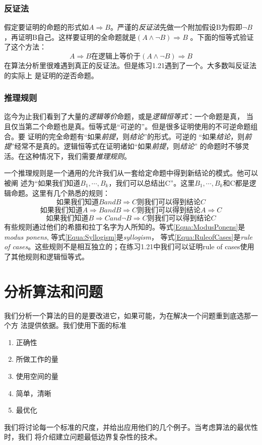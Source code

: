 \subsubsection{反证法}
假定要证明的命题的形式如$A \Rightarrow
B$。严谨的\emph{反证法}先做一个附加假设B为假即$\neg
B$，再证明B自己。这样要证明的全命题就是$(A \wedge \neg B)\Rightarrow
B$ 。下面的恒等式验证了这个方法：
\begin{equation}
    A \Rightarrow B \mbox{在逻辑上等价于} (A \wedge \neg B)\Rightarrow B
\end{equation}
在算法分析里很难遇到真正的反证法。但是练习1.21遇到了一个。大多数叫反证法的实际上
是证明的逆否命题。

\subsubsection{推理规则}
迄今为止我们看到了大量的\emph{逻辑等价}命题，或是\emph{逻辑恒等式}：一个命题是真，
当且仅当第二个命题也是真。恒等式是“可逆的”。但是很多证明使用的不可逆命题组合。要
证明的完全命题有“如果\emph{前提}，则\emph{结论}”的形式。可逆的
“如果\emph{结论}，则\emph{前提}”经常不是真的。逻辑恒等式在证明诸如“如果\emph{前提}，则\emph{结论}”
的命题时不够灵活。在这种情况下，我们需要\emph{推理规则}。

一个推理规则是一个通用的允许我们从一套给定命题中得到新结论的模式。他可以被阐
述为“如果我们知道$B_1, \cdots , B_k$，我们可以总结出C”。这里$B_1,
\cdots , B_k$和C都是逻辑命题。这里有几个熟悉的规则：
\begin{equation}\label{Equa:ModusPonens}
    \mbox{如果我们知道} B and  B\Rightarrow C \mbox{则我们可以得到结论} C
\end{equation}
\begin{equation}\label{Equa:Syllogism}
    \mbox{如果我们知道} A\Rightarrow B and B\Rightarrow C \mbox{则我们可以得到结论} A\Rightarrow C
\end{equation}
\begin{equation}\label{Equa:RuleofCases}
    \mbox{如果我们知道} B\Rightarrow C and \neg B\Rightarrow C \mbox{则我们可以得到结论} C
\end{equation}
有些规则通过他们的希腊和拉丁名字为人所知的。等式\ref{Equa:ModusPonens}是
\emph{modus ponens}, 等式\ref{Equa:Syllogism}是\emph{syllogism}，
等式\ref{Equa:RuleofCases}是\emph{rule of
cases}。这些规则不是相互独立的；在练习1.21中我们可以证明rule of
cases使用了其他规则和逻辑恒等式。


\section{分析算法和问题}
我们分析一个算法的目的是要改进它，如果可能，为在解决一个问题重到底选那一个方
法提供依据。我们使用下面的标准
\begin{enumerate}
    \item 正确性
    \item 所做工作的量
    \item 使用空间的量
    \item 简单，清晰
    \item 最优化
\end{enumerate}
我们将讨论每一个标准的尺度，并给出应用他们的几个例子。当考虑算法的最优性时，我们
将介绍建立问题最低边界复杂性的技术。

